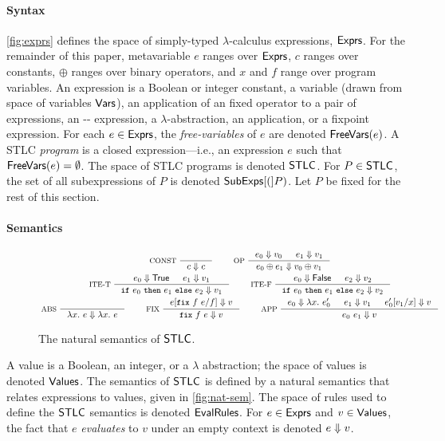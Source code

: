 \paragraph{Syntax} \autoref{fig:exprs} defines the space of
simply-typed $\lambda$-calculus expressions, $\mathsf{Exprs}$.
%
For the remainder of this paper, metavariable $e$ ranges over
$\mathsf{Exprs}$, %
$c$ ranges over constants, %
$\oplus$ ranges over binary operators, and $x$ and $f$ range over
program variables.
%
An expression is a Boolean or integer constant, %
a variable (drawn from space of variables $\mathsf{Vars}$), %
an application of an fixed operator to a pair of expressions, %
an -- expression, %
a $\lambda$-abstraction, %
an application, or %
a fixpoint expression.
%
For each $e \in \mathsf{Exprs}$, the \emph{free-variables} of $e$ are denoted
$\mathsf{FreeVars}(e)$.
%
A STLC \emph{program} is a closed expression---i.e., an expression $e$
such that $\mathsf{FreeVars}(e) = \emptyset$.
%
The space of STLC programs is denoted $\mathsf{STLC}$.
%
For $P \in \mathsf{STLC}$, the set of all subexpressions of $P$ is denoted
$\mathsf{SubExps}[ ( ]P)$.
%
Let $P$ be fixed for the rest of this section.

\paragraph{Semantics}
%
\begin{figure}
  \centering
  \begin{gather*}
  \inference[ CONST ]{ }{ c \evalsto c } \qquad
  \inference[ OP ]{ %
    e_0 \evalsto v_0 & %
    e_1 \evalsto v_1 } %
  { e_0 \oplus e_1 \evalsto v_0 \oplus v_1 } \\
  \inference[ ITE-T ]{ %
    e_0 \evalsto \true & %
    e_1 \evalsto v_1 } %
  { \ite{ e_0 }{ e_1 }{ e_2 } \evalsto v_1 } \qquad
  \inference[ ITE-F ]{ %
    e_0 \evalsto \false & %
    e_2 \evalsto v_2 } %
  { \ite{ e_0 }{ e_1 }{ e_2 } \evalsto v_2 } \\
  \inference[ ABS ]{ } %
  { \lambda x.\ e \evalsto \lambda x.\ e } \qquad
  \inference[ FIX ]{ e[ \fix{ f }{ e } / f ] \evalsto v } %
  { \fix{ f }{ e } \evalsto v } \qquad
  \inference[ APP ]{ %
    e_0 \evalsto \lambda x.\ e_0' & %
    e_1 \evalsto v_1 & %
    e_0'[ v_1 / x ] \evalsto v }
  { e_0\ e_1 \evalsto v } 
  \end{gather*}
  \caption{The natural semantics of $\mathsf{STLC}$.}
  \label{fig:nat-sem}
\end{figure}
%
A value is a Boolean, an integer, or a $\lambda$ abstraction;
%
the space of values is denoted $\mathsf{Values}$.
%
The semantics of $\mathsf{STLC}$ is defined by a natural semantics that
relates expressions to values, given in \autoref{fig:nat-sem}.
%
The space of rules used to define the $\mathsf{STLC}$ semantics is denoted
$\mathsf{EvalRules}$.
%
For $e \in \mathsf{Exprs}$ and $v \in \mathsf{Values}$, the fact that $e$
\emph{evaluates} to $v$ under an empty context is denoted $e \Downarrow
v$.

